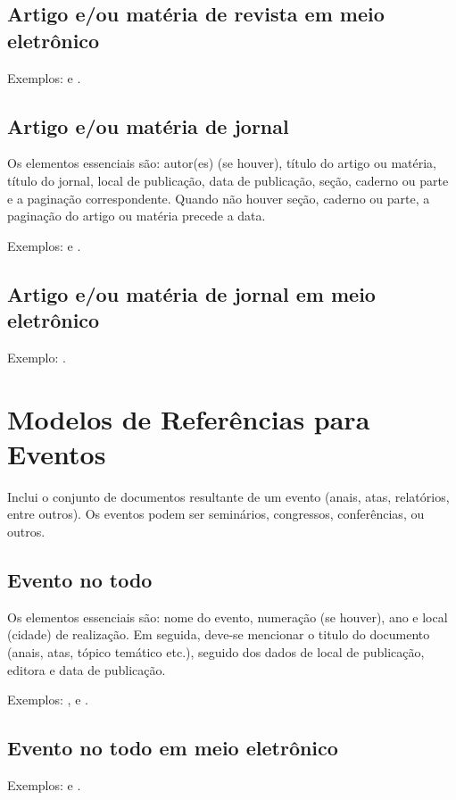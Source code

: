 \documentclass[monografia]{subfiles}
\begin{document}
	\subsection{Artigo e/ou matéria de revista em meio eletrônico}

	Exemplos: \cite{artigorevistadigital01} e \cite{artigorevistadigital02}.

	\subsection{Artigo e/ou matéria de jornal}
	Os elementos essenciais são: autor(es) (se houver), título do
artigo ou matéria, título do jornal, local de publicação, data de
publicação, seção, caderno ou parte e a paginação correspondente.
Quando não houver seção, caderno ou parte, a paginação do artigo ou
matéria precede a data.

	Exemplos: \cite{artigojornal01} e \cite{artigojornal02}.

	\subsection{Artigo e/ou matéria de jornal em meio eletrônico}

	Exemplo: \cite{artigojornaldigital01}.

	\section{Modelos de Referências para Eventos}
	Inclui o conjunto de documentos resultante de um evento (anais,
atas, relatórios, entre outros). Os eventos podem ser seminários,
congressos, conferências, ou outros.

	\subsection{Evento no todo}
	Os elementos essenciais são: nome do evento, numeração (se
houver), ano e local (cidade) de realização. Em seguida, deve-se
mencionar o titulo do documento (anais, atas, tópico temático etc.),
seguido dos dados de local de publicação, editora e data de publicação.

	Exemplos: \cite{evento01}, \cite{evento02} e \cite{evento03}.

	\subsection{Evento no todo em meio eletrônico}
	Exemplos: \cite{eventodigital01} e \cite{eventodigital02}.
\end{document}
